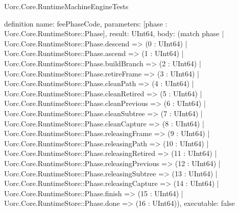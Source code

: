 \begin{lexlean}{Uorc.Core.RuntimeMachineEngineTests}
\begin{semanticmodule}
definition{
  name: feePhaseCode,
  parameters: [phase : Uorc.Core.RuntimeStore::Phase],
  result: UInt64,
  body: (match phase
    | Uorc.Core.RuntimeStore::Phase.descend => (0 : UInt64)
    | Uorc.Core.RuntimeStore::Phase.ascend => (1 : UInt64)
    | Uorc.Core.RuntimeStore::Phase.buildBranch => (2 : UInt64)
    | Uorc.Core.RuntimeStore::Phase.retireFrame => (3 : UInt64)
    | Uorc.Core.RuntimeStore::Phase.cleanPath => (4 : UInt64)
    | Uorc.Core.RuntimeStore::Phase.cleanRetired => (5 : UInt64)
    | Uorc.Core.RuntimeStore::Phase.cleanPrevious => (6 : UInt64)
    | Uorc.Core.RuntimeStore::Phase.cleanSubtree => (7 : UInt64)
    | Uorc.Core.RuntimeStore::Phase.cleanCapture => (8 : UInt64)
    | Uorc.Core.RuntimeStore::Phase.releasingFrame => (9 : UInt64)
    | Uorc.Core.RuntimeStore::Phase.releasingPath => (10 : UInt64)
    | Uorc.Core.RuntimeStore::Phase.releasingRetired => (11 : UInt64)
    | Uorc.Core.RuntimeStore::Phase.releasingPrevious => (12 : UInt64)
    | Uorc.Core.RuntimeStore::Phase.releasingSubtree => (13 : UInt64)
    | Uorc.Core.RuntimeStore::Phase.releasingCapture => (14 : UInt64)
    | Uorc.Core.RuntimeStore::Phase.finish => (15 : UInt64)
    | Uorc.Core.RuntimeStore::Phase.done => (16 : UInt64)),
  executable: false
}


\end{semanticmodule}
\end{lexlean}
